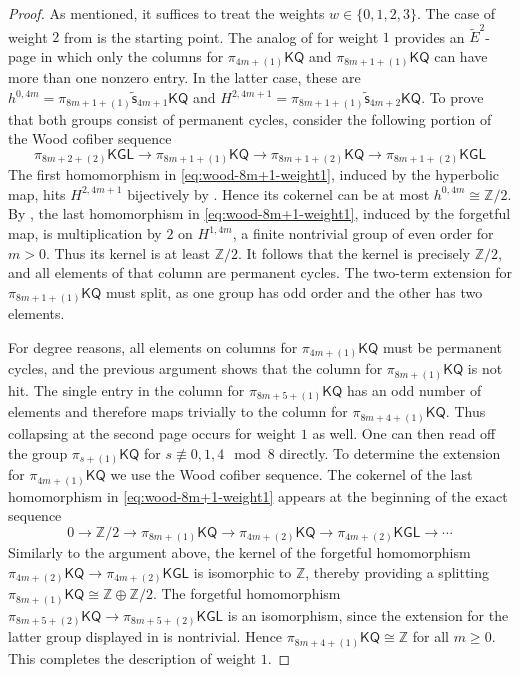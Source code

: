 \documentclass[11pt,hyp,english]{article}
\newcommand{\Z}{\mathbb{Z}}
\newcommand{\KGL}{\mathsf{KGL}}
\newcommand{\KQ}{\mathsf{KQ}}
\newcommand{\vs}{\tilde{\mathsf{s}}}
\theoremstyle{definition}
\begin{document}
\begin{proof}
As mentioned, it suffices to treat the weights $w \in \{0,1,2,3\}$.  
The case of weight $2$ from  is the starting point.  
The analog of  for weight $1$ provides an $\tilde{E}^2$-page in which only the columns for $\pi_{4m+(1)}\KQ$ and $\pi_{8m+1+(1)}\KQ$ can have more than one nonzero entry.  
In the latter case, these are $h^{0,4m} = \pi_{8m+1+(1)}\vs_{4m+1}\KQ$ and $H^{2,4m+1} = \pi_{8m+1+(1)}\vs_{4m+2}\KQ$.  
To prove that both groups consist of permanent cycles, 
consider the following portion of the Wood cofiber sequence
\begin{equation}\label{eq:wood-8m+1-weight1}
  \pi_{8m+2+(2)}\KGL \to \pi_{8m+1+(1)}\KQ \to \pi_{8m+1+(2)}\KQ \to \pi_{8m+1+(2)}\KGL
\end{equation}
The first homomorphism in \eqref{eq:wood-8m+1-weight1}, induced by the hyperbolic map, hits $H^{2,4m+1}$ bijectively by .  
Hence its cokernel can be at most $h^{0,4m} \cong \Z/2$.  
By , the last homomorphism in \eqref{eq:wood-8m+1-weight1}, induced by the forgetful map, is multiplication by $2$ on $H^{1,4m}$, a finite nontrivial group of even order for $m>0$.  
Thus its kernel is at least $\Z/2$.  
It follows that the kernel is precisely $\Z/2$, and all elements of that column are permanent cycles.  
The two-term extension for $\pi_{8m+1+(1)}\KQ$ must split, as one group has odd order and the other has two elements.  

For degree reasons, all elements on columns for $\pi_{4m+(1)}\KQ$ must be permanent cycles, and the previous argument shows that the column for $\pi_{8m+(1)}\KQ$ is not hit.  
The single entry in the column for $\pi_{8m+5+(1)}\KQ$ has an odd number of elements and therefore maps trivially to the column for $\pi_{8m+4+(1)}\KQ$.  
Thus collapsing at the second page occurs for weight $1$ as well.  
One can then read off the group $\pi_{s+(1)}\KQ$ for $s \not\equiv 0,1,4 \mod 8$ directly.  
To determine the extension for $\pi_{4m+(1)}\KQ$ we use the Wood cofiber sequence.  
The cokernel of the last homomorphism in \eqref{eq:wood-8m+1-weight1} appears at the beginning of the exact sequence
\[
  0 \to \Z/2 \to \pi_{8m+(1)}\KQ \to \pi_{4m+(2)}\KQ \to \pi_{4m+(2)}\KGL \to \dotsm
\]
Similarly to the argument above, the kernel of the forgetful homomorphism $\pi_{4m+(2)}\KQ \to \pi_{4m+(2)}\KGL$ is isomorphic to $\Z$, thereby providing a splitting $\pi_{8m+(1)}\KQ \cong \Z \oplus \Z/2$.  
The forgetful homomorphism $\pi_{8m+5+(2)}\KQ \to \pi_{8m+5+(2)}\KGL$ is an isomorphism, since the extension for the latter group displayed in  is nontrivial.  
Hence $\pi_{8m+4+(1)}\KQ \cong \Z$ for all $m \geq 0$.  
This completes the description of weight $1$.  


\end{proof}
\end{document}
